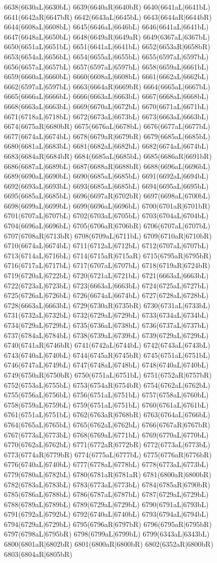 6638(6630aL|6630bL) 6639(6640aR|6640bR) 6640(6641aL|6641bL) 6641(6642aR|6647bR) 6642(6643aL|6645bL) 6643(6644aR|6644bR) 6644(6608aL|6608bL) 6645(6646aL|6646bL) 6646(6641aL|6641bL) 6647(6648aL|6650bL) 6648(6649aR|6649aR) 6649(6367aL|6367bL) 6650(6651aL|6651bL) 6651(6641aL|6641bL) 6652(6653aR|6658bR) 6653(6654aL|6656bL) 6654(6655aL|6655bL) 6655(6597aL|6597bL) 6656(6657aL|6657bL) 6657(6597aL|6597bL) 6658(6659aL|6661bL) 6659(6660aL|6660bL) 6660(6608aL|6608bL) 6661(6662aL|6662bL) 6662(6597aL|6597bL) 6663(6664aR|6669bR) 6664(6665aL|6667bL) 6665(6666aL|6666bL) 6666(6663aL|6663bL) 6667(6668aL|6668bL) 6668(6663aL|6663bL) 6669(6670aL|6672bL) 6670(6671aL|6671bL) 6671(6718aL|6718bL) 6672(6673aL|6673bL) 6673(6663aL|6663bL) 6674(6675aR|6680bR) 6675(6676aL|6678bL) 6676(6677aL|6677bL) 6677(6674aL|6674bL) 6678(6679aR|6679bR) 6679(6685aL|6685bL) 6680(6681aL|6683bL) 6681(6682aL|6682bL) 6682(6674aL|6674bL) 6683(6684aR|6684bR) 6684(6685aL|6685bL) 6685(6686aR|6691bR) 6686(6687aL|6689bL) 6687(6688aR|6688bR) 6688(6696aL|6696bL) 6689(6690aL|6690bL) 6690(6685aL|6685bL) 6691(6692aL|6694bL) 6692(6693aL|6693bL) 6693(6685aL|6685bL) 6694(6695aL|6695bL) 6695(6685aL|6685bL) 6696(6697aR|6702bR) 6697(6698aL|6700bL) 6698(6699aL|6699bL) 6699(6696aL|6696bL) 6700(6701aR|6701bR) 6701(6707aL|6707bL) 6702(6703aL|6705bL) 6703(6704aL|6704bL) 6704(6696aL|6696bL) 6705(6706aR|6706bR) 6706(6707aL|6707bL) 6707(6708aR|6713bR) 6708(6709aL|6711bL) 6709(6710aR|6710bR) 6710(6674aL|6674bL) 6711(6712aL|6712bL) 6712(6707aL|6707bL) 6713(6714aL|6716bL) 6714(6715aR|6715aR) 6715(6795aR|6795bR) 6716(6717aL|6717bL) 6717(6707aL|6707bL) 6718(6719aR|6724bR) 6719(6720aL|6722bL) 6720(6721aL|6721bL) 6721(6663aL|6663bL) 6722(6723aL|6723bL) 6723(6663aL|6663bL) 6724(6725aL|6727bL) 6725(6726aL|6726bL) 6726(6674aL|6674bL) 6727(6728aL|6728bL) 6728(6663aL|6663bL) 6729(6730aR|6735bR) 6730(6731aL|6733bL) 6731(6732aL|6732bL) 6732(6729aL|6729bL) 6733(6734aL|6734bL) 6734(6729aL|6729bL) 6735(6736aL|6738bL) 6736(6737aL|6737bL) 6737(6784aL|6784bL) 6738(6739aL|6739bL) 6739(6729aL|6729bL) 6740(6741aR|6746bR) 6741(6742aL|6744bL) 6742(6743aL|6743bL) 6743(6740aL|6740bL) 6744(6745aR|6745bR) 6745(6751aL|6751bL) 6746(6747aL|6749bL) 6747(6748aL|6748bL) 6748(6740aL|6740bL) 6749(6750aR|6750bR) 6750(6751aL|6751bL) 6751(6752aR|6757bR) 6752(6753aL|6755bL) 6753(6754aR|6754bR) 6754(6762aL|6762bL) 6755(6756aL|6756bL) 6756(6751aL|6751bL) 6757(6758aL|6760bL) 6758(6759aL|6759bL) 6759(6751aL|6751bL) 6760(6761aL|6761bL) 6761(6751aL|6751bL) 6762(6763aR|6768bR) 6763(6764aL|6766bL) 6764(6765aL|6765bL) 6765(6762aL|6762bL) 6766(6767aR|6767bR) 6767(6773aL|6773bL) 6768(6769aL|6771bL) 6769(6770aL|6770bL) 6770(6762aL|6762bL) 6771(6772aR|6772bR) 6772(6773aL|6773bL) 6773(6774aR|6779bR) 6774(6775aL|6777bL) 6775(6776aR|6776bR) 6776(6740aL|6740bL) 6777(6778aL|6778bL) 6778(6773aL|6773bL) 6779(6780aL|6782bL) 6780(6781aR|6781aR) 6781(6800aR|6800bR) 6782(6783aL|6783bL) 6783(6773aL|6773bL) 6784(6785aR|6790bR) 6785(6786aL|6788bL) 6786(6787aL|6787bL) 6787(6729aL|6729bL) 6788(6789aL|6789bL) 6789(6729aL|6729bL) 6790(6791aL|6793bL) 6791(6792aL|6792bL) 6792(6740aL|6740bL) 6793(6794aL|6794bL) 6794(6729aL|6729bL) 6795(6796aR|6797bR) 6796(6795aR|6795bR) 6797(6798aL|6795bR) 6798(6799aL|6799bL) 6799(6343aL|6343bL) 6800(6801aR|6802bR) 6801(6800aR|6800bR) 6802(6352aR|6800bR) 6803(6804aR|6805bR) 